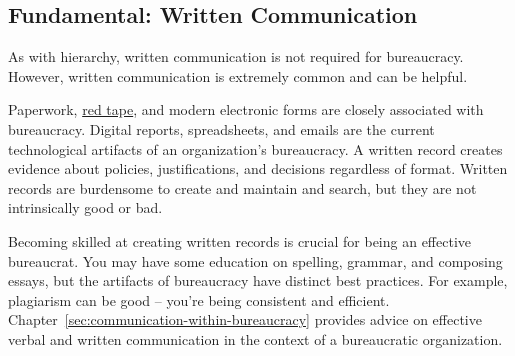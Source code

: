 \subsection*{Fundamental: Written Communication\label{sec:written-communication}}

As with hierarchy, written communication is not required for bureaucracy. However, written communication is extremely common and can be helpful. %

Paperwork,  \href{https://en.wikipedia.org/wiki/Red_tape}{red tape},
and modern electronic forms are closely associated with bureaucracy.
Digital reports, spreadsheets, and emails are the current technological artifacts of an organization's bureaucracy. A written record creates evidence about policies, justifications, and decisions regardless of format. %
Written records are burdensome to create and maintain and search, but they are not intrinsically good or bad. 

Becoming skilled at creating written records is crucial for being an effective bureaucrat. You may have some education on spelling, grammar, and composing essays, but the artifacts of bureaucracy have distinct best practices. For example, plagiarism can be good -- you're being consistent and efficient.  
Chapter~\ref{sec:communication-within-bureaucracy} 
provides advice on effective verbal and written communication in the context of a bureaucratic organization. 